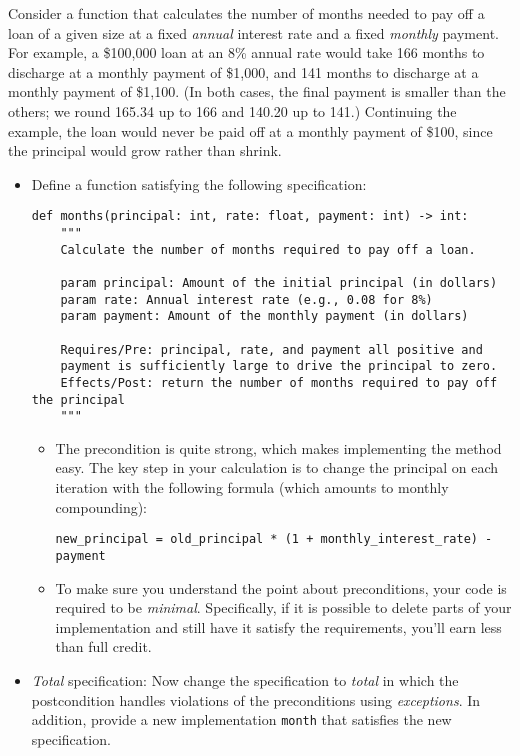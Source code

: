 \documentclass[oneside,11pt,dvipsnames]{book}
\newcommand{\code}[1]{\texttt{#1}}
\begin{document}
Consider a function that calculates the number of months needed to pay off a loan of a given size at a fixed \emph{annual} interest rate and a fixed \emph{monthly} payment. For example, a \$100,000 loan at an 8\% annual rate would take 166 months to discharge at a monthly payment of \$1,000, and 141 months to discharge at a monthly payment of \$1,100. (In both cases, the final payment is smaller than the others; we round 165.34 up to 166 and 140.20 up to 141.) Continuing the example, the loan would never be paid off at a monthly payment of \$100, since the principal would grow rather than shrink.

\begin{itemize}


\item Define a function satisfying the following specification:

\begin{lstlisting}
def months(principal: int, rate: float, payment: int) -> int:
    """
    Calculate the number of months required to pay off a loan.
    
    param principal: Amount of the initial principal (in dollars)
    param rate: Annual interest rate (e.g., 0.08 for 8%)
    param payment: Amount of the monthly payment (in dollars)
    
    Requires/Pre: principal, rate, and payment all positive and 
    payment is sufficiently large to drive the principal to zero.
    Effects/Post: return the number of months required to pay off the principal
    """
\end{lstlisting}

\begin{itemize}
    \item The precondition is quite strong, which makes implementing the method easy. The key step in your calculation is to change the principal on each iteration with the following formula (which amounts to monthly compounding):
    \begin{lstlisting}
new_principal = old_principal * (1 + monthly_interest_rate) - payment
    \end{lstlisting}

    \item To make sure you understand the point about preconditions, your code is required to be \emph{minimal}. Specifically, if it is possible to delete parts of your implementation and still have it satisfy the requirements, you'll earn less than full credit.
\end{itemize}
\item \emph{Total} specification: Now change the specification to \emph{total} in which the postcondition handles violations of the preconditions using \emph{exceptions}. In addition, provide a new implementation \code{month} that satisfies the new specification.
\end{itemize}
\end{document}

